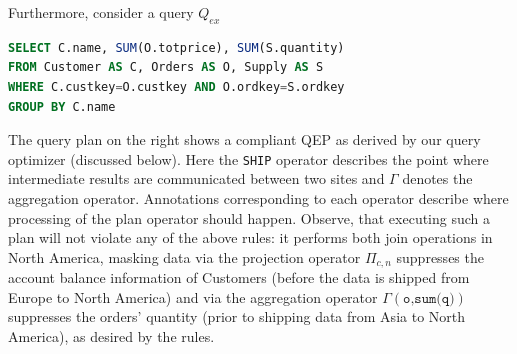 \documentclass[11pt]{article}
\newcommand\join\Join
\newcommand\proj\Pi
\newcommand\SHIP{\texttt{SHIP}\xspace}
\begin{document}
\begin{figure}
\centering
\vspace*{-0.6cm}
\end{figure}

\noindent Furthermore, consider a query $Q_{ex}$
\begin{lstlisting}[language=sql,belowskip=-15pt,aboveskip=3pt]
SELECT C.name, SUM(O.totprice), SUM(S.quantity)
FROM Customer AS C, Orders AS O, Supply AS S
WHERE C.custkey=O.custkey AND O.ordkey=S.ordkey
GROUP BY C.name
\end{lstlisting}


\noindent The query plan on the right shows a compliant QEP
as derived by our query optimizer (discussed below). Here
the \SHIP operator describes the point where intermediate
results are communicated between two sites and $\Gamma$
denotes the aggregation operator. Annotations corresponding
to each operator describe where processing of the plan
operator should happen. Observe, that executing such a plan
will not violate any of the above rules: it performs both
join operations in North America, masking data via the
projection operator $\proj_{c,n}$ suppresses the account
balance information of Customers (before the data is shipped
from Europe to North America) and via the aggregation
operator $\Gamma(\texttt{o,sum(q)})$ suppresses the orders'
quantity (prior to shipping data from Asia to North
America), as desired by the rules.
\end{document}
